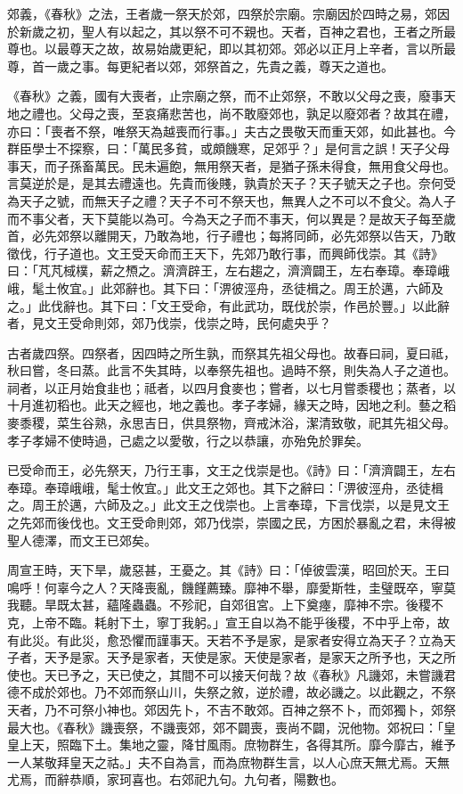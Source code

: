 
郊義，《春秋》之法，王者歲一祭天於郊，四祭於宗廟。宗廟因於四時之易，郊因於新歲之初，聖人有以起之，其以祭不可不親也。天者，百神之君也，王者之所最尊也。以最尊天之故，故易始歲更紀，即以其初郊。郊必以正月上辛者，言以所最尊，首一歲之事。每更紀者以郊，郊祭首之，先貴之義，尊天之道也。


《春秋》之義，國有大喪者，止宗廟之祭，而不止郊祭，不敢以父母之喪，廢事天地之禮也。父母之喪，至哀痛悲苦也，尚不敢廢郊也，孰足以廢郊者？故其在禮，亦曰：「喪者不祭，唯祭天為越喪而行事。」夫古之畏敬天而重天郊，如此甚也。今群臣學士不探察，曰：「萬民多貧，或頗饑寒，足郊乎？」是何言之誤！天子父母事天，而子孫畜萬民。民未遍飽，無用祭天者，是猶子孫未得食，無用食父母也。言莫逆於是，是其去禮遠也。先貴而後賤，孰貴於天子？天子號天之子也。奈何受為天子之號，而無天子之禮？天子不可不祭天也，無異人之不可以不食父。為人子而不事父者，天下莫能以為可。今為天之子而不事天，何以異是？是故天子每至歲首，必先郊祭以離開天，乃敢為地，行子禮也；每將同師，必先郊祭以告天，乃敢徵伐，行子道也。文王受天命而王天下，先郊乃敢行事，而興師伐崇。其《詩》曰：「芃芃棫樸，薪之槱之。濟濟辟王，左右趨之，濟濟闢王，左右奉璋。奉璋峨峨，髦土攸宜。」此郊辭也。其下曰：「淠彼涇舟，丞徒楫之。周王於邁，六師及之。」此伐辭也。其下曰：「文王受命，有此武功，既伐於崇，作邑於豐。」以此辭者，見文王受命則郊，郊乃伐崇，伐崇之時，民何處央乎？


古者歲四祭。四祭者，因四時之所生孰，而祭其先祖父母也。故春曰祠，夏曰祗，秋曰嘗，冬曰蒸。此言不失其時，以奉祭先祖也。過時不祭，則失為人子之道也。祠者，以正月始食韭也；祗者，以四月食麥也；嘗者，以七月嘗黍稷也；蒸者，以十月進初稻也。此天之經也，地之義也。孝子孝婦，緣天之時，因地之利。藝之稻麥黍稷，菜生谷熟，永思吉日，供具祭物，齊戒沐浴，潔清致敬，祀其先祖父母。孝子孝婦不使時過，己處之以愛敬，行之以恭讓，亦殆免於罪矣。

已受命而王，必先祭天，乃行王事，文王之伐崇是也。《詩》曰：「濟濟闢王，左右奉璋。奉璋峨峨，髦士攸宜。」此文王之郊也。其下之辭曰：「淠彼涇舟，丞徒楫之。周王於邁，六師及之。」此文王之伐崇也。上言奉璋，下言伐崇，以是見文王之先郊而後伐也。文王受命則郊，郊乃伐崇，崇國之民，方困於暴亂之君，未得被聖人德澤，而文王已郊矣。


周宣王時，天下旱，歲惡甚，王憂之。其《詩》曰：「倬彼雲漢，昭回於天。王曰鳴呼！何辜今之人？天降喪亂，饑饉薦臻。靡神不舉，靡愛斯牲，圭璧既卒，寧莫我聽。旱既太甚，蘊隆蟲蟲。不殄祀，自郊徂宮。上下奠瘞，靡神不宗。後稷不克，上帝不臨。耗射下土，寧丁我躬。」宣王自以為不能乎後稷，不中乎上帝，故有此災。有此災，愈恐懼而謹事天。天若不予是家，是家者安得立為天子？立為天子者，天予是家。天予是家者，天使是家。天使是家者，是家天之所予也，天之所使也。天已予之，天已使之，其間不可以接天何哉？故《春秋》凡譏郊，未嘗譏君德不成於郊也。乃不郊而祭山川，失祭之敘，逆於禮，故必譏之。以此觀之，不祭天者，乃不可祭小神也。郊因先卜，不吉不敢郊。百神之祭不卜，而郊獨卜，郊祭最大也。《春秋》譏喪祭，不譏喪郊，郊不闢喪，喪尚不闢，況他物。郊祝曰：「皇皇上天，照臨下土。集地之靈，降甘風雨。庶物群生，各得其所。靡今靡古，維予一人某敬拜皇天之祜。」夫不自為言，而為庶物群生言，以人心庶天無尤焉。天無尤焉，而辭恭順，家珂喜也。右郊祀九句。九句者，陽數也。

